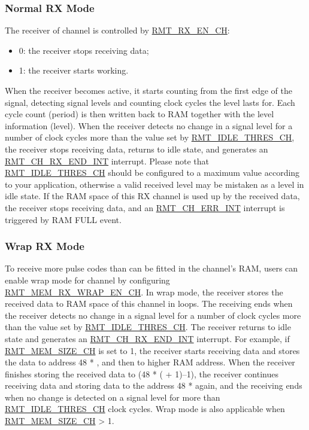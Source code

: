 \documentclass[main\_\_EN.tex]{subfiles}
\begin{document}
\subsubsection{Normal RX Mode}\label{sec:normal-rx-mode}

The receiver of channel  is controlled by \hyperref[fielddesc:RMTRXENCHM]{RMT\_RX\_EN\_CH}: 
\begin{itemize}
    \item 0: the receiver stops receiving data;
    \item 1: the receiver starts working.
\end{itemize}

When the receiver becomes active, it starts counting from the first edge of the signal, detecting signal levels and counting clock cycles the level lasts for. Each cycle count (period) is then written back to RAM together with the level information (level). When the receiver detects no change in a signal level for a number of clock cycles more than the value set by \hyperref[fielddesc:RMTIDLETHRESCHM]{RMT\_IDLE\_THRES\_CH}, the receiver stops receiving data, returns to idle state, and generates an \hyperref[int:RMTCHMRXENDINT]{RMT\_CH\_RX\_END\_INT} interrupt. Please note that \hyperref[fielddesc:RMTIDLETHRESCHM]{RMT\_IDLE\_THRES\_CH} should be configured to a maximum value according to your application, otherwise a valid received level may be mistaken as a level in idle state. If the RAM space of this RX channel is used up by the received data, the receiver stops receiving data, and an \hyperref[int:RMTCHNERRINT]{RMT\_CH\_ERR\_INT} interrupt is triggered by RAM FULL event.

\subsubsection{Wrap RX Mode}

To receive more pulse codes than can be fitted in the channel's RAM, users can enable wrap mode for channel  by configuring \hyperref[fielddesc:RMTMEMRXWRAPENCHM]{RMT\_MEM\_RX\_WRAP\_EN\_CH}. In wrap mode, the receiver stores the received data to RAM space of this channel in loops. The receiving ends when the receiver detects no change in a signal level for a number of clock cycles more than the value set by \hyperref[fielddesc:RMTIDLETHRESCHM]{RMT\_IDLE\_THRES\_CH}. The receiver returns to idle state and generates an \hyperref[int:RMTCHMRXENDINT]{RMT\_CH\_RX\_END\_INT} interrupt. For example, if \hyperref[fielddesc:RMTMEMSIZECHM]{RMT\_MEM\_SIZE\_CH} is set to 1, the receiver starts receiving data and stores the data to address 48 * , and then to higher RAM address. When the receiver finishes storing the received data to (48 * ( + 1)$–$1), the receiver continues receiving data and storing data to the address 48 *   again, and the receiving ends when no change is detected on a signal level for more than \hyperref[fielddesc:RMTIDLETHRESCHM]{RMT\_IDLE\_THRES\_CH} clock cycles. Wrap mode is also applicable when \hyperref[fielddesc:RMTMEMSIZECHM]{RMT\_MEM\_SIZE\_CH} > 1.
\end{document}
